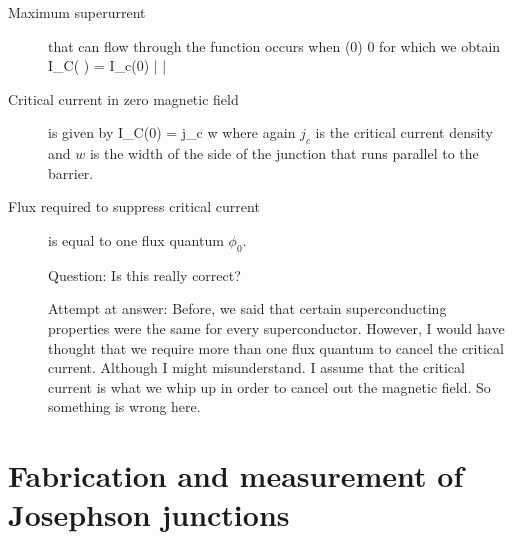 \begin{description}
\item[Maximum superurrent] that can flow through the function occurs when
\beq
\phi(0) 0 \pm {}
\eeq
for which we obtain
\beq
I_C( \Phi) = I_c(0) \left|  \right|
\eeq



\item[Critical current in zero magnetic field] is given by 
\beq
I_C(0) = j_c w
\eeq
where again $j_c$ is the critical current density and $w$ is the width of the side of the junction that runs parallel to the barrier. 

\item[Flux required to suppress critical current] is equal to one flux quantum $\phi_0$. 

Question: Is this really correct? 

Attempt at answer: Before, we said that certain superconducting properties were the same for every superconductor. However, I would have thought that we require more than one flux quantum to cancel the critical current. Although I might misunderstand. I assume that the critical current is what we whip up in order to cancel out the magnetic field. So something is wrong here. 

\end{description}

\section{Fabrication and measurement of Josephson junctions}
